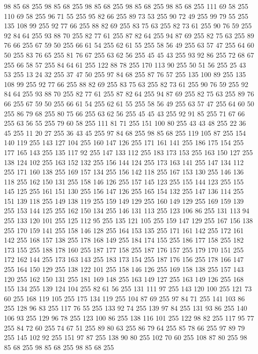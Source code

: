 98 85 68 255 98 85 68 255 98 85 68 255 98 85 68 255 98 85 68 255 111 69 58 255 110 69 58 255 96 71 55 255 95 82 66 255 89 73 53 255 90 72 49 255 99 79 55 255 135 108 99 255 92 77 66 255 88 82 69 255 83 75 63 255 82 73 61 255 90 76 59 255 92 84 64 255 93 88 70 255 82 77 61 255 87 82 64 255 94 87 69 255 82 75 63 255 89 76 66 255 67 59 50 255 66 61 54 255 62 61 55 255 58 56 49 255 63 57 47 255 64 60 50 255 83 76 65 255 81 76 67 255 63 62 56 255 45 45 43 255 93 92 86 255 72 68 67 255 66 58 57 255 84 64 61 255 122 88 78 255 170 113 90 255 50 51 56 255 25 43 53 255 13 24 32 255 37 47 50 255 97 84 68 255 87 76 57 255 135 100 89 255 135 108 99 255 92 77 66 255 88 82 69 255 83 75 63 255 82 73 61 255 90 76 59 255 92 84 64 255 93 88 70 255 82 77 61 255 87 82 64 255 94 87 69 255 82 75 63 255 89 76 66 255 67 59 50 255 66 61 54 255 62 61 55 255
58 56 49 255 63 57 47 255 64 60 50 255 86 79 68 255 80 75 66 255 63 62 56 255 45 45 43 255 92 91 85 255 71 67 66 255 63 56 55 255 79 60 58 255 111 81 71 255 151 100 80 255 43 43 48 255 22 36 45 255 11 20 27 255 36 43 45 255 97 84 68 255 98 85 68 255 119 105 87 255 154 140 119 255 143 127 104 255 160 147 126 255 171 161 141 255 186 175 154 255 177 165 143 255 135 117 92 255 147 133 112 255 183 173 153 255 163 150 127 255 138 124 102 255 163 152 132 255 156 144 124 255 173 163 141 255 147 134 112 255 171 160 138 255 169 157 134 255 156 142 118 255 167 153 130 255 146 136 118 255 162 150 131 255 158 146 126 255 157 145 123 255 155 144 123 255 155 145 125 255 161 151 130 255 156 147 126 255 165 154 132 255 147 136 114 255 151 139 118 255 149 138 119 255 159 149 129 255 160 149 129 255 169 159 139 255 153 144 125 255 162 150 134 255 146 131 113 255 123 106 86 255 131 113 94 255 133 120 101 255 125 112 95 255 135 121 105 255 159 147 129 255 167 156 138 255
170 159 141 255 158 146 128 255 164 153 135 255 171 161 142 255 172 161 142 255 168 157 138 255 178 168 149 255 184 174 155 255 186 177 158 255 182 173 155 255 188 178 160 255 187 177 158 255 187 176 157 255 179 170 151 255 172 162 144 255 173 163 143 255 183 173 154 255 187 176 156 255 178 166 147 255 164 150 129 255 138 122 101 255 158 146 126 255 169 158 138 255 157 143 120 255 162 150 131 255 181 169 148 255 163 149 127 255 163 149 126 255 168 155 134 255 139 124 104 255 82 61 56 255 131 111 97 255 143 120 100 255 121 73 60 255 168 119 105 255 175 134 119 255 104 87 69 255 97 84 71 255 141 103 86 255 128 96 83 255 117 76 55 255 133 92 74 255 139 97 84 255 131 93 86 255 140 106 93 255 129 96 78 255 123 100 86 255 138 116 101 255 122 98 82 255 117 95 77 255 84 72 60 255 74 67 51 255 89 80 63 255 86 79 64 255 85 78 66 255 97 89 79 255 145 102 92 255 151 97 87 255 138 90 80 255 102 70 60 255 108 87 80 255 98 85 68 255 98 85 68 255 98 85 68 255
